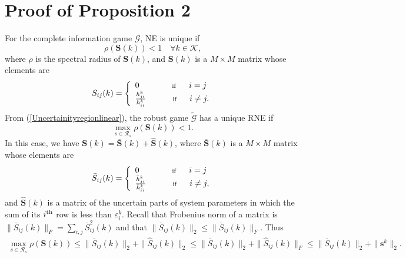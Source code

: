 \documentclass[peerreview,onecolumn,11pt,draftclsnofoot]{IEEEtran}\usepackage{amsmath}\usepackage{amsfonts}\usepackage{epsfig}\usepackage{amssymb}\usepackage{graphicx}\usepackage{amssymb,amsmath}\usepackage{cite}\usepackage{color,soul}\newcommand\T{\rule{0pt}{3.1ex}}
\begin{document}
\section{Proof of Proposition 2}
For the complete information game $\mathcal{G}$, NE is unique \cite{Nash1} if
\begin{equation}\label{0.Proof of Proposition 2.}
\rho(\textbf{S}(k))<1 \quad \forall k \in \mathcal{K},
\end{equation}
where $\rho$ is the spectral radius of $\textbf{S}(k)$, and
$\textbf{S}(k)$ is a $M \times M$ matrix whose elements are
\begin{eqnarray}\label{1.Proof of Proposition 2.}
 S_{ij}(k) =  \left\{\begin{array}{l l}
0 \qquad\qquad \scriptsize{\textnormal{if}}\qquad i=j \\
 \frac{h^{k}_{ji}}{h^{k}_{ii}} \qquad \;\quad\;\!\! \scriptsize{\textnormal{if}} \qquad i\neq j. \end{array} \right.
 \end{eqnarray}
From (\ref{Uncertainityregionlinear}), the robust game
$\widetilde{\mathcal{G}}$ has a unique
RNE if
\begin{equation}\label{2.Proof of Proposition 2.}
    \max_{s\in \mathcal{R}_{s}} \rho (\textbf{S}(k))<1.
\end{equation}
In this case, we have
$\textbf{S}(k)= \bar{\textbf{S}}(k)+ \hat{\textbf{S}}(k)$,
where $\bar{\textbf{S}}(k)$ is a $M \times M$ matrix whose elements are \begin{eqnarray}\label{4.Proof of Proposition 2}
 \bar{S}_{ij}(k) =  \left\{\begin{array}{l l}
0 \qquad\qquad \scriptsize{\textnormal{if}}\qquad i=j \\
 \frac{\bar{h}^{k}_{ji}}{\bar{h}^{k}_{ii}} \qquad \;\quad\;\!\! \scriptsize{\textnormal{if}} \qquad i\neq j, \end{array} \right.
 \end{eqnarray}
and $\hat{\textbf{S}}(k)$ is a matrix of the uncertain parts of
system parameters in which the sum of its
$i^{{\scriptsize{\textnormal{th}}}}$ row is less than
 $\varepsilon^{k}_{i}$. Recall that Frobenius norm of a matrix is  $\|\bar{S}_{ij}(k)\|_{F}=\sum_{i,j}\bar{S}^{2}_{ij}(k)$ and that  $\|\bar{S}_{ij}(k)\|_{2}\leq\|\bar{S}_{ij}(k)\|_{F}$. Thus
 \begin{eqnarray}\label{5. Proof of Proposition 2}
     \max_{s\in \mathcal{R}_{s}} \rho (\textbf{S}(k))\leq  \|\bar{S}_{ij}(k)\|_{2}+   \|\hat{S}_{ij}(k)\|_{2} \leq \|\bar{S}_{ij}(k)\|_{2}+
     \|\hat{S}_{ij}(k)\|_{F}\leq\|\bar{S}_{ij}(k)\|_{2}+\|\mathbf{s}^{k}\|_2.
\end{eqnarray}
\end{document}
